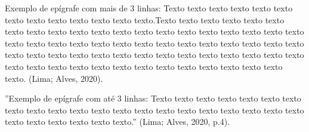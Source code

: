 


\vspace*{10cm}
\begin{citacao}
Exemplo de epígrafe com mais de 3 linhas: Texto texto texto texto texto texto texto texto texto texto texto texto texto.Texto texto texto texto texto texto texto texto texto texto texto texto texto texto texto texto texto texto texto texto texto texto texto texto texto texto texto texto texto texto texto texto texto texto texto texto texto texto texto texto texto texto texto texto texto texto texto texto texto texto texto texto texto texto texto texto texto texto texto texto texto texto. (Lima; Alves, 2020).
\end{citacao}

    \vspace*{5cm}
	
		''Exemplo de epígrafe com até 3 linhas: Texto texto texto texto texto texto texto texto texto texto texto texto texto texto texto texto texto texto texto texto texto texto texto texto texto texto texto.'' (Lima; Alves, 2020, p.4).
	
\newpage